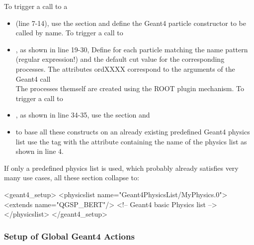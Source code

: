 \documentclass[10pt,a4paper]{article}
\begin{document}
To trigger a call to a
\begin{itemize}\itemcompact
\item {} (line 7-14), use the  section 
    and define the Geant4 particle constructor to be called by name. To trigger a call to
\item {}, as shown in line 19-30, 
    Define for each particle matching the name pattern (regular expression!) and the 
    default cut value for the corresponding processes. The attributes ordXXXX correspond
    to the arguments of the Geant4 call \\
    The processes themself are created using the ROOT plugin mechanism.
    To trigger a call to
\item {}, as shown in line 34-35, use the  section
    and 
\item to base all these constructs on an already existing predefined Geant4 physics list
    use the  tag with the attribute containing the name of the physics list
    as shown in line 4.
\end{itemize}
If only a predefined physics list is used, which probably already satisfies very many use cases,
all these section collapse to:
\begin{code}
<geant4_setup>
  <physicslist name="Geant4PhysicsList/MyPhysics.0">
    <extends name="QGSP_BERT"/>                    <!-- Geant4 basic Physics list -->
  </physicslist>
</geant4_setup>
\end{code}

\subsubsection{Setup of Global Geant4 Actions}
\label{sec:ddg4-setup-xml-geant4-actions}
\end{document}
